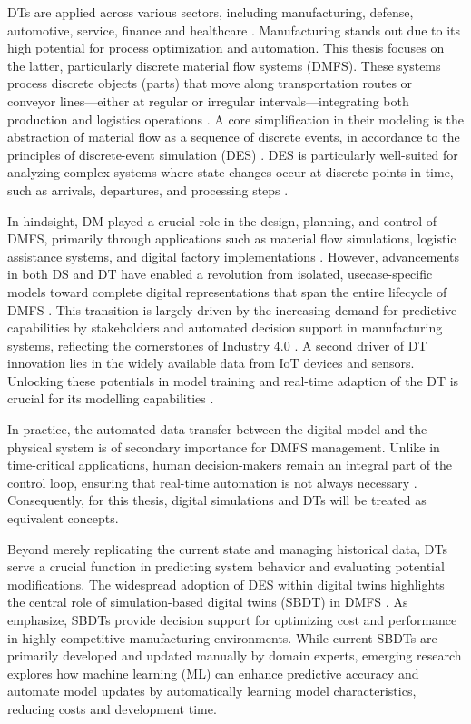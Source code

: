 DTs are applied across various sectors, including manufacturing, defense, automotive, service, finance and healthcare \parencite{Tao2018ijamt}. Manufacturing stands out due to its high potential for process optimization and automation. This thesis focuses on the latter, particularly discrete material flow systems (DMFS). These systems process discrete objects (parts) that move along transportation routes or conveyor lines—either at regular or irregular intervals—integrating both production and logistics operations \parencite{arnold2005materialfluss, schwede2024learning}. A core simplification in their modeling is the abstraction of material flow as a sequence of discrete events, in accordance to the principles of discrete-event simulation (DES) \parencite{kovacs2016mathematical, robinson2014simulation}. DES is particularly well-suited for analyzing complex systems where state changes occur at discrete points in time, such as arrivals, departures, and processing steps \parencite{robinson2014simulation}.

In hindsight, DM played a crucial role in the design, planning, and control of DMFS, primarily through applications such as material flow simulations, logistic assistance systems, and digital factory implementations \parencite{Thiede2013}. However, advancements in both DS and DT have enabled a revolution from isolated, usecase-specific models toward complete digital representations that span the entire lifecycle of DMFS \parencite{Abdoune2023}. This transition is largely driven by the increasing demand for predictive capabilities by stakeholders and automated decision support in manufacturing systems, reflecting the cornerstones of Industry 4.0 \parencite{frank2019industry}. A second driver of DT innovation lies in the widely available data from IoT devices and sensors. Unlocking these potentials in model training and real-time adaption of the DT is crucial for its modelling capabilities \parencite{Tao2018ijamt}.

In practice, the automated data transfer between the digital model and the physical system is of secondary importance for DMFS management. Unlike in time-critical applications, human decision-makers remain an integral part of the control loop, ensuring that real-time automation is not always necessary \parencite{schwede2024learning}. Consequently, for this thesis, digital simulations and DTs will be treated as equivalent concepts.

Beyond merely replicating the current state and managing historical data, DTs serve a crucial function in predicting system behavior and evaluating potential modifications. The widespread adoption of DES within digital twins highlights the central role of simulation-based digital twins (SBDT) in DMFS \parencite{Lugaresi2021aifac}. As \citeauthor{schwede2024learning} emphasize, SBDTs provide decision support for optimizing cost and performance in highly competitive manufacturing environments. While current SBDTs are primarily developed and updated manually by domain experts, emerging research explores how machine learning (ML) can enhance predictive accuracy and automate model updates by automatically learning model characteristics, reducing costs and development time.

